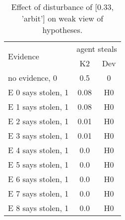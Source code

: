 \begin{table}\begin{tabular}{l|cc}\toprule\multirow{2}{*}{Evidence} & \multicolumn{2}{c}{agent steals}\\& {K2} & {Dev}\\\midrule
no evidence, 0 & \cellcolor{Bittersweet}0.5&\cellcolor{Bittersweet}0\\E 0 says stolen, 1 & \cellcolor{Bittersweet}0.08&\cellcolor{Bittersweet}H0\\E 1 says stolen, 1 & \cellcolor{Bittersweet}0.08&\cellcolor{Bittersweet}H0\\E 2 says stolen, 1 & \cellcolor{Bittersweet}0.01&\cellcolor{Bittersweet}H0\\E 3 says stolen, 1 & \cellcolor{Bittersweet}0.01&\cellcolor{Bittersweet}H0\\E 4 says stolen, 1 & \cellcolor{Bittersweet}0.0&\cellcolor{Bittersweet}H0\\E 5 says stolen, 1 & \cellcolor{Bittersweet}0.0&\cellcolor{Bittersweet}H0\\E 6 says stolen, 1 & \cellcolor{Bittersweet}0.0&\cellcolor{Bittersweet}H0\\E 7 says stolen, 1 & \cellcolor{Bittersweet}0.0&\cellcolor{Bittersweet}H0\\E 8 says stolen, 1 & \cellcolor{Bittersweet}0.0&\cellcolor{Bittersweet}H0\\\bottomrule\end{tabular}\caption{Effect of disturbance of [0.33, 'arbit'] on weak view of hypotheses.}\end{table}
